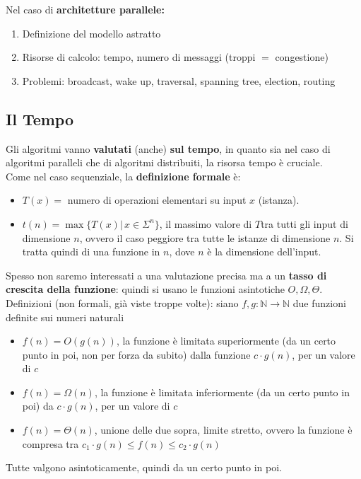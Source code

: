 \documentclass[11pt]{article}
\begin{document}
	Nel caso di \textbf{architetture parallele:}
	\begin{enumerate}
		\item Definizione del modello astratto 
		\item Risorse di calcolo: tempo, numero di messaggi (troppi $=$ congestione)
		\item Problemi: broadcast, wake up, traversal, spanning tree, election, routing
	\end{enumerate}
	
	\newpage
	
	\subsection*{Il Tempo}
	
	Gli algoritmi vanno \textbf{valutati} (anche) \textbf{sul tempo}, in quanto sia nel caso di algoritmi paralleli che di algoritmi distribuiti, la risorsa tempo è cruciale.\\
	
	Come nel caso sequenziale, la \textbf{definizione formale} è:
	\begin{itemize}
		\item $T(x) =$ numero di operazioni elementari su input $x$ (istanza). \\
		
		\item $t(n) = \max \{T(x) | \, x \in \Sigma^n \}$, il massimo valore di $T$tra tutti gli input di dimensione $n$, ovvero il caso peggiore tra tutte le istanze di dimensione $n$. Si tratta quindi di una funzione in $n$, dove $n$ è la dimensione dell'input.\\
	\end{itemize}
	
	Spesso non saremo interessati a una valutazione precisa ma a un \textbf{tasso di crescita della funzione}: quindi si usano le funzioni asintotiche $O, \Omega, \Theta$.\\
	
	Definizioni (non formali, già viste troppe volte): siano $f,g: \mathbb{N} \rightarrow \mathbb{N}$ due funzioni definite sui numeri naturali
	\begin{itemize}
		\item $f(n) = O(g(n))$, la funzione è limitata superiormente (da un certo punto in poi, non per forza da subito) dalla funzione $c \cdot g(n)$, per un valore di $c$
		
		\item $f(n) = \Omega (n)$, la funzione è limitata inferiormente (da un certo punto in poi) da $c \cdot g(n)$, per un valore di $c$
		
		\item $f(n) = \Theta(n)$, unione delle due sopra, limite stretto, ovvero la funzione è compresa tra $c_1 \cdot g(n) \leq f(n) \leq c_2 \cdot g(n)$
	\end{itemize}
	Tutte valgono asintoticamente, quindi da un certo punto in poi.\\
	
\end{document}
